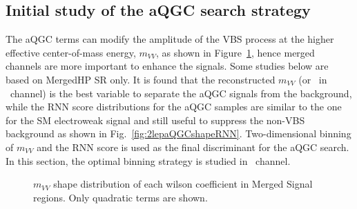 \subsection{Initial study of the aQGC search strategy}
\label{subsec:binnedsig}

The aQGC terms can modify the amplitude of the VBS process at the higher effective center-of-mass energy, 
$m_{VV}$, as shown in Figure~\ref{fig:2lepaQGCshapeMVV}, hence merged channels are more important to enhance the signals.
Some studies below are based on MergedHP SR only.
It is found that the reconstructed $m_{VV}$ (or \mt\ in \zlep\ channel) is the best variable to separate the aQGC signals from the background,
while the RNN score distributions for the aQGC samples are similar to the one for the SM electroweak signal and still useful 
to suppress the non-VBS background as shown in Fig.~\ref{fig:2lepaQGCshapeRNN}.
Two-dimensional binning of $m_{VV}$ and the RNN score is used as the final discriminant for the aQGC search.
In this section, the optimal binning strategy is studied in \tlep\ channel.

\begin{figure}[ht]
    \centering
    \caption{$m_{VV}$ shape distribution of each wilson coefficient in Merged Signal regions. Only quadratic terms are shown.}
    \label{fig:2lepaQGCshapeMVV}
\end{figure}

